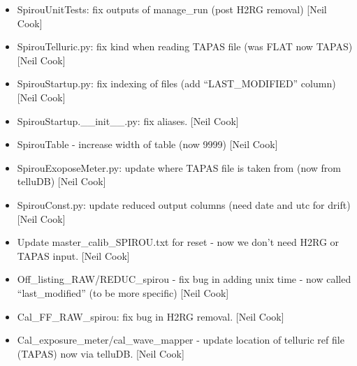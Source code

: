 \documentclass[a4paper,10pt,english]{report}
\begin{document}
\begin{itemize}
\item {} 
SpirouUnitTests: fix outputs of manage\_run (post H2RG removal) {[}Neil
Cook{]}

\item {} 
SpirouTelluric.py: fix kind when reading TAPAS file (was FLAT now
TAPAS) {[}Neil Cook{]}

\item {} 
SpirouStartup.py: fix indexing of files (add “LAST\_MODIFIED” column)
{[}Neil Cook{]}

\item {} 
SpirouStartup.\_\_init\_\_.py: fix aliases. {[}Neil Cook{]}

\item {} 
SpirouTable - increase width of table (now 9999) {[}Neil Cook{]}

\item {} 
SpirouExoposeMeter.py: update where TAPAS file is taken from (now from
telluDB) {[}Neil Cook{]}

\item {} 
SpirouConst.py: update reduced output columns (need date and utc for
drift) {[}Neil Cook{]}

\item {} 
Update master\_calib\_SPIROU.txt for reset - now we don’t need H2RG or
TAPAS input. {[}Neil Cook{]}

\item {} 
Off\_listing\_RAW/REDUC\_spirou - fix bug in adding unix time - now
called “last\_modified” (to be more specific) {[}Neil Cook{]}

\item {} 
Cal\_FF\_RAW\_spirou: fix bug in H2RG removal. {[}Neil Cook{]}

\item {} 
Cal\_exposure\_meter/cal\_wave\_mapper - update location of telluric ref
file (TAPAS) now via telluDB. {[}Neil Cook{]}

\end{itemize}
\end{document}
